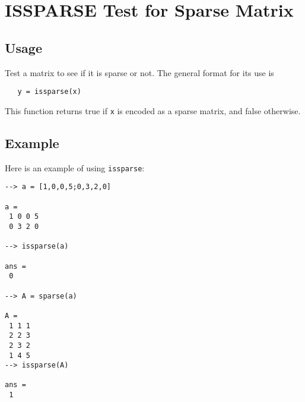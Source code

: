 \section{ISSPARSE Test for Sparse Matrix}

\subsection{Usage}

Test a matrix to see if it is sparse or not.  The general
format for its use is 
\begin{verbatim}
   y = issparse(x)
\end{verbatim}
This function returns true if \verb|x| is encoded as a sparse
matrix, and false otherwise.
\subsection{Example}

Here is an example of using \verb|issparse|:
\begin{verbatim}
--> a = [1,0,0,5;0,3,2,0]

a = 
 1 0 0 5 
 0 3 2 0 

--> issparse(a)

ans = 
 0 

--> A = sparse(a)

A = 
 1 1 1
 2 2 3
 2 3 2
 1 4 5
--> issparse(A)

ans = 
 1 
\end{verbatim}
